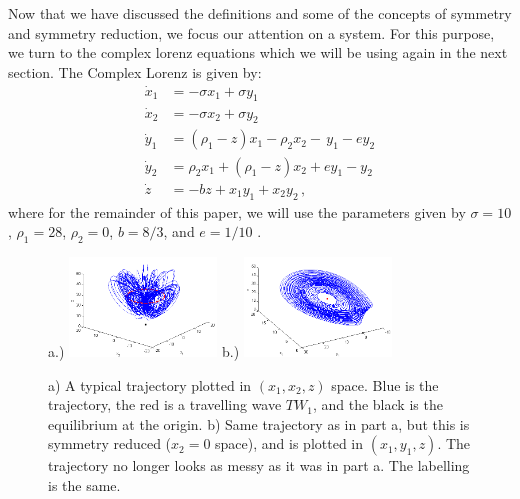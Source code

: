\documentclass[12 pt]{article}
\begin{document}
Now that we have discussed the definitions and some of the concepts of symmetry and symmetry reduction, we focus our attention on a system.  For this purpose, we turn to the complex lorenz equations which we will be using again in the next section. The Complex Lorenz is given by:
\begin{equation}
\begin{split}
  \dot x_1 &= -\sigma x_1  + \sigma y_1 \\
  \dot x_2 &=  -\sigma x_2  + \sigma y_2 \\
  \dot y_1 &= (\rho_1  -  z)x_1  -  \rho_2x_2  - \, y_1  - ey_2 \\
  \dot y_2 &= \rho_2x_1  +  (\rho_1  -  z)x_2  +  ey_1  -  y_2 \\
  \dot z &= -bz  + x_1y_1+x_2y_2 \,,
  \label{eq:CLE}
\end{split}
\end{equation}
where for the remainder of this paper, we will use the parameters given by $\sigma = 10$, $\rho_1 = 28$, $\rho_2 = 0$, $b = 8/3$, and $e = 1/10$ \cite{Eth}.
\begin{figure}[h]
\centering
a.)  \includegraphics[width=0.35\textwidth]{Figs/Section2/kcCLEaxisonc.png}
b.)
  \includegraphics[width=0.35\textwidth]{Figs/Section2/kcCLEredaxisonc.png}
\caption{
a) A typical trajectory plotted in $(x_1, x_2, z)$ space.  Blue is the trajectory, the red is a travelling wave $TW_1$, and the black is the equilibrium at the origin.
b) Same trajectory as in part a, but this is symmetry reduced ($x_2 = 0$ space), and is plotted in $(x_1, y_1, z)$.  The trajectory no longer looks as messy as it was in part a.  The labelling is the same.
}
 \label{fig:CLETraj}
\end{figure}
\end{document}
